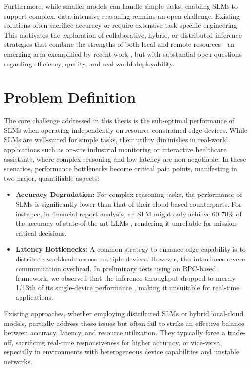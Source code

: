 Furthermore, while smaller models can handle simple tasks, enabling SLMs to support complex, data-intensive reasoning remains an open challenge. Existing solutions often sacrifice accuracy or require extensive task-specific engineering. This motivates the exploration of collaborative, hybrid, or distributed inference strategies that combine the strengths of both local and remote resources—an emerging area exemplified by recent work \cite{Narayan2025Minions}, but with substantial open questions regarding efficiency, quality, and real-world deployability.

\section{Problem Definition}
The core challenge addressed in this thesis is the sub-optimal performance of SLMs when operating independently on resource-constrained edge devices. While SLMs are well-suited for simple tasks, their utility diminishes in real-world applications such as on-site industrial monitoring or interactive healthcare assistants, where complex reasoning and low latency are non-negotiable. In these scenarios, performance bottlenecks become critical pain points, manifesting in two major, quantifiable aspects:

\begin{itemize}
    \item \textbf{Accuracy Degradation:} For complex reasoning tasks, the performance of SLMs is significantly lower than that of their cloud-based counterparts. For instance, in financial report analysis, an SLM might only achieve 60-70\% of the accuracy of state-of-the-art LLMs \cite{DeepSeek-RL}, rendering it unreliable for mission-critical decisions.
    \item \textbf{Latency Bottlenecks:} A common strategy to enhance edge capability is to distribute workloads across multiple devices. However, this introduces severe communication overhead. In preliminary tests using an RPC-based framework, we observed that the inference throughput dropped to merely 1/13th of its single-device performance \cite{LlamaCpp-Issue}, making it unsuitable for real-time applications.
\end{itemize}

Existing approaches, whether employing distributed SLMs or hybrid local-cloud models, partially address these issues but often fail to strike an effective balance between accuracy, latency, and resource utilization. They typically force a trade-off, sacrificing real-time responsiveness for higher accuracy, or vice-versa, especially in environments with heterogeneous device capabilities and unstable networks.

